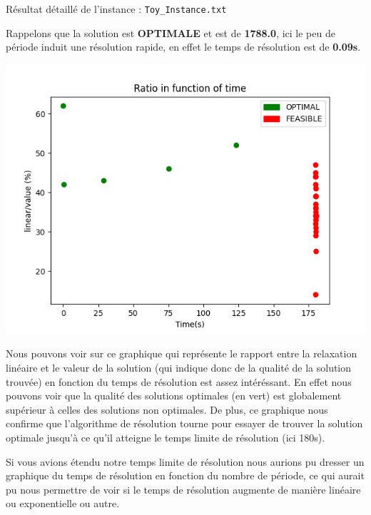 \documentclass[10pt]{article}
\begin{document}
\begin{displayquote}
Résultat détaillé de l'instance : \texttt{Toy\_Instance.txt}
\end{displayquote}

Rappelons que la solution est \textbf{OPTIMALE} et est de \textbf{1788.0}, ici le peu de période induit une résolution rapide, en effet le temps de résolution est de \textbf{0.09s}.

\begin{center}
\includegraphics[max width=\textwidth]{FH7W_HOUq0cJPP4pauJ7B-iXxNQurcsuVAkoylhbvhU_original_fullsize}
\end{center}

Nous pouvons voir sur ce graphique qui représente le rapport entre la relaxation linéaire et le valeur de la solution (qui indique donc de la qualité de la solution trouvée) en fonction du temps de résolution est assez intéréssant. En effet nous pouvons voir que la qualité des solutions optimales (en vert) est globalement supérieur à celles des solutions non optimales. De plus, ce graphique nous confirme que l'algorithme de résolution tourne pour essayer de trouver la solution optimale jusqu'à ce qu'il atteigne le temps limite de résolution (ici 180s).

\begin{displayquote}
Si vous avions étendu notre temps limite de résolution nous aurions pu dresser un graphique du temps de résolution en fonction du nombre de période, ce qui aurait pu nous permettre de voir si le temps de résolution augmente de manière linéaire ou exponentielle ou autre.
\end{displayquote}
\end{document}
